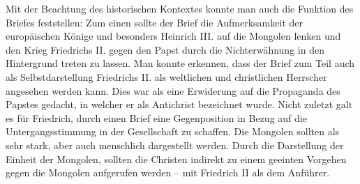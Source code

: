 \documentclass[12pt,headsepline,a4paper]{scrartcl}
\begin{document}
Mit der Beachtung des historischen Kontextes konnte man auch die Funktion des
Briefes feststellen: Zum einen sollte der Brief die Aufmerksamkeit der europäischen
Könige und besonders Heinrich III. auf die Mongolen lenken und den Krieg Friedrichs
II. gegen den Papst durch die Nichterwähnung in den Hintergrund treten zu lassen. Man
konnte erkennen, dass der Brief zum Teil auch als Selbstdarstellung Friedrichs II. als
weltlichen und christlichen Herrscher angesehen werden kann. Dies war als eine Erwiderung auf die
Propaganda des Papstes gedacht, in welcher er als Antichrist bezeichnet wurde. Nicht
zuletzt galt es für Friedrich, durch einen Brief eine Gegenposition in Bezug auf die
Untergangsstimmung in der Gesellschaft zu schaffen. Die Mongolen sollten als sehr
stark, aber auch menschlich dargestellt werden. Durch die Darstellung der Einheit der
Mongolen, sollten die Christen indirekt zu einem geeinten Vorgehen gegen die
Mongolen aufgerufen werden – mit Friedrich II als dem Anführer.
%
\printbibliography
\end{document}
